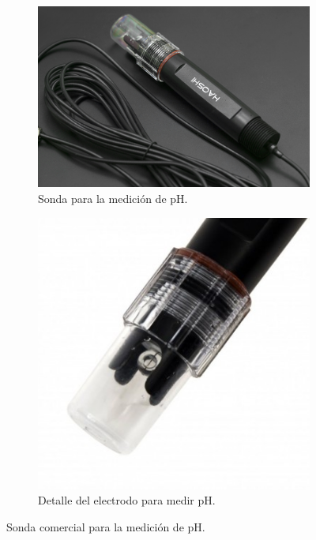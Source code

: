 \begin{figure}[h]
\centering
\begin{subfigure}{.5\textwidth}
  	\centering
    \includegraphics[height=.2\textheight]{./Figures/sensor_pH1}
	\caption[]{Sonda para la medición de pH\protect\footnotemark .}
	\label{fig:sensor_pH1}
\end{subfigure}%
\begin{subfigure}{.5\textwidth}
	\centering
    \includegraphics[height=.2\textheight]{./Figures/sensor_pH2}
	\caption[]{Detalle del electrodo para medir pH\protect\footnotemark .}
	\label{fig:sensor_pH2}
\end{subfigure}
\caption{Sonda comercial para la medición de pH.}
\label{fig:sensores_pH}
\end{figure}






